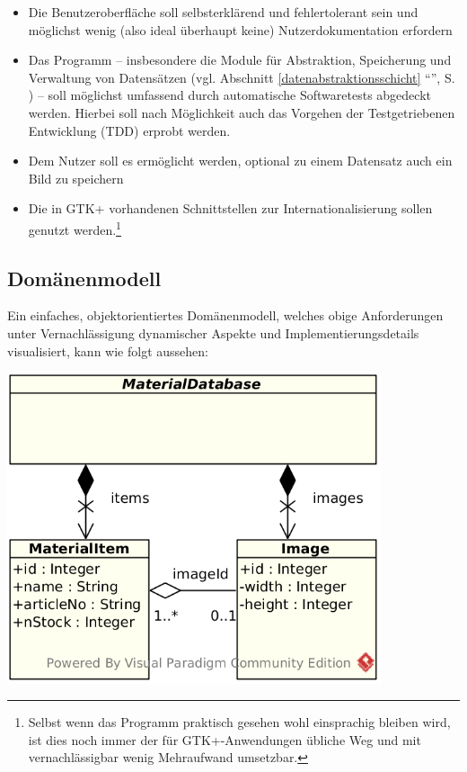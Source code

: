\begin{itemize}
\item Die Benutzeroberfläche soll selbsterklärend und fehlertolerant sein und möglichst wenig (also ideal überhaupt keine)
Nutzerdokumentation erfordern
\item Das Programm -- insbesondere die Module für Abstraktion, Speicherung und Verwaltung von Datensätzen (vgl.
Abschnitt \ref{datenabstraktionsschicht} ``'', S. \pageref{datenabstraktionsschicht})
-- soll möglichst umfassend durch automatische Softwaretests abgedeckt werden.
Hierbei soll nach Möglichkeit auch das Vorgehen der Testgetriebenen Entwicklung (TDD) erprobt werden.
\item Dem Nutzer soll es ermöglicht werden, optional zu einem Datensatz auch ein Bild zu speichern
\item Die in GTK+ vorhandenen Schnittstellen zur Internationalisierung sollen genutzt werden.\footnote{Selbst wenn das
Programm praktisch gesehen wohl einsprachig bleiben wird, ist dies noch immer der für GTK+-Anwendungen übliche Weg
und mit vernachlässigbar wenig Mehraufwand umsetzbar.}
\end{itemize}

\newpage
\subsection{Domänenmodell}
Ein einfaches, objektorientiertes Domänenmodell, welches obige Anforderungen unter Vernachlässigung dynamischer Aspekte
und Implementierungsdetails visualisiert, kann wie folgt aussehen:

\begin{center}
\noindent\includegraphics[width=110mm,keepaspectratio]{images/01-domaenenmodell.png}
\end{center}

